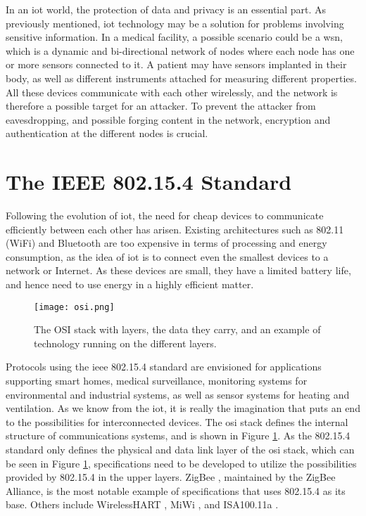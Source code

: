 In an \gls{iot} world, the protection of data and privacy is an essential part. As previously mentioned, \gls{iot} technology may be a solution for problems involving sensitive information. In a medical facility, a possible scenario could be a \gls{wsn}, which is a dynamic and bi-directional network of nodes where each node has one or more sensors connected to it. A patient may have sensors implanted in their body, as well as different instruments attached for measuring different properties. All these devices communicate with each other wirelessly, and the network is therefore a possible target for an attacker. To prevent the attacker from eavesdropping, and possible forging content in the network, encryption and authentication at the different nodes is crucial.








\section{The IEEE 802.15.4 Standard}
\label{sec:802154}

Following the evolution of \gls{iot}, the need for cheap devices to communicate efficiently between each other has arisen. Existing architectures such as 802.11 (WiFi) and Bluetooth are too expensive in terms of processing and energy consumption, as the idea of \gls{iot} is to connect even the smallest devices to a network or Internet. As these devices are small, they have a limited battery life, and hence need to use energy in a highly efficient matter.

\begin{figure}[h]
	\centering
	\texttt{[image: osi.png]}
	\caption{The OSI stack with layers, the data they carry, and an example of technology running on the different layers.}
	\label{fig:osi}
\end{figure}

Protocols using the \gls{ieee} 802.15.4 standard are envisioned for applications supporting smart homes, medical surveillance, monitoring systems for environmental and industrial systems, as well as sensor systems for heating and ventilation. As we know from the \gls{iot}, it is really the imagination that puts an end to the possibilities for interconnected devices. The \gls{osi} stack defines the internal structure of communications systems, and is shown in Figure \ref{fig:osi}. As the 802.15.4 standard only defines the physical and data link layer of the \gls{osi} stack, which can be seen in Figure \ref{fig:osi}, specifications need to be developed to utilize the possibilities provided by 802.15.4 in the upper layers. ZigBee \cite{zigbee}, maintained by the ZigBee Alliance, is the most notable example of specifications that uses 802.15.4 as its base. Others include WirelessHART \citep{wirelesshart}, MiWi \cite{miwi}, and ISA100.11a \cite{isa100}.

